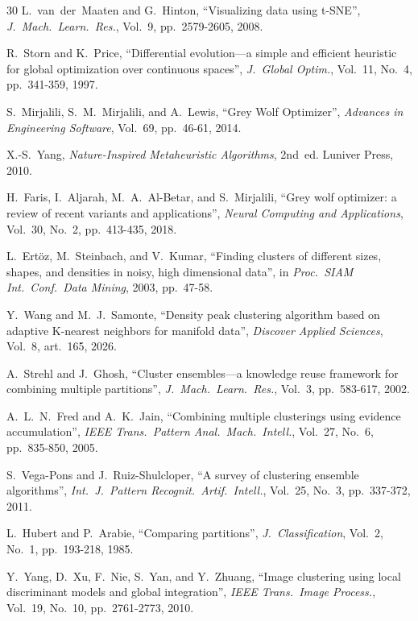 \documentclass[journal]{IEEEtran}
\begin{document}
\begin{thebibliography}{30}
L.~van~der~Maaten and G.~Hinton, ``Visualizing data using t-SNE'', \emph{J.\ Mach.\ Learn.\ Res.}, Vol.~9, pp.~2579-2605, 2008.

R.~Storn and K.~Price, ``Differential evolution---a simple and efficient heuristic for global optimization over continuous spaces'', \emph{J.\ Global Optim.}, Vol.~11, No.~4, pp.~341-359, 1997.

S.~Mirjalili, S.~M.~Mirjalili, and A.~Lewis, ``Grey Wolf Optimizer'', \emph{Advances in Engineering Software}, Vol.~69, pp.~46-61, 2014.

X.-S.~Yang, \emph{Nature-Inspired Metaheuristic Algorithms}, 2nd~ed. Luniver Press, 2010.

H.~Faris, I.~Aljarah, M.~A.~Al-Betar, and S.~Mirjalili, ``Grey wolf optimizer: a review of recent variants and applications'', \emph{Neural Computing and Applications}, Vol.~30, No.~2, pp.~413-435, 2018.

L.~Ert\"{o}z, M.~Steinbach, and V.~Kumar, ``Finding clusters of different sizes, shapes, and densities in noisy, high dimensional data'', in \emph{Proc.\ SIAM Int.\ Conf.\ Data Mining}, 2003, pp.~47-58.

Y.~Wang and M.~J.~Samonte, ``Density peak clustering algorithm based on adaptive K-nearest neighbors for manifold data'', \emph{Discover Applied Sciences}, Vol.~8, art.~165, 2026.

A.~Strehl and J.~Ghosh, ``Cluster ensembles---a knowledge reuse framework for combining multiple partitions'', \emph{J.\ Mach.\ Learn.\ Res.}, Vol.~3, pp.~583-617, 2002.

A.~L.~N.~Fred and A.~K.~Jain, ``Combining multiple clusterings using evidence accumulation'', \emph{IEEE Trans.\ Pattern Anal.\ Mach.\ Intell.}, Vol.~27, No.~6, pp.~835-850, 2005.

S.~Vega-Pons and J.~Ruiz-Shulcloper, ``A survey of clustering ensemble algorithms'', \emph{Int.\ J.\ Pattern Recognit.\ Artif.\ Intell.}, Vol.~25, No.~3, pp.~337-372, 2011.

L.~Hubert and P.~Arabie, ``Comparing partitions'', \emph{J.\ Classification}, Vol.~2, No.~1, pp.~193-218, 1985.

Y.~Yang, D.~Xu, F.~Nie, S.~Yan, and Y.~Zhuang, ``Image clustering using local discriminant models and global integration'', \emph{IEEE Trans.\ Image Process.}, Vol.~19, No.~10, pp.~2761-2773, 2010.


\end{thebibliography}
\end{document}
